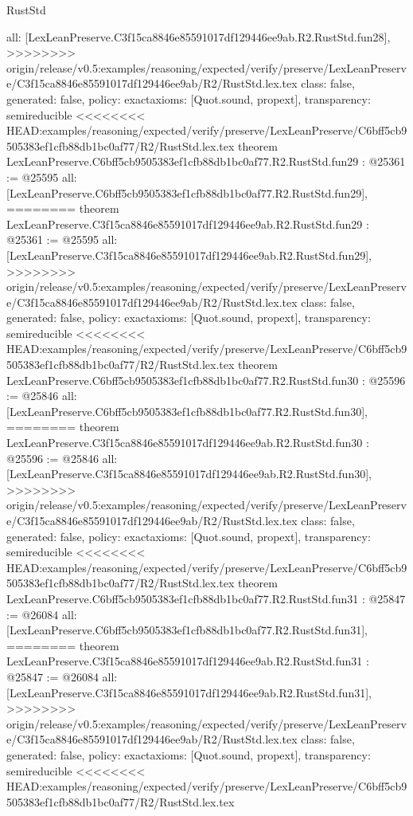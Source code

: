 \begin{lexlean}{RustStd}
\begin{coremodule}
{\begin{coremodule}
{{{{{{{{{{{{{{{{{{{{{{{{{{{{{{{{  all: [LexLeanPreserve.C3f15ca8846e85591017df129446ee9ab.R2.RustStd.fun28],
>>>>>>>> origin/release/v0.5:examples/reasoning/expected/verify/preserve/LexLeanPreserve/C3f15ca8846e85591017df129446ee9ab/R2/RustStd.lex.tex
  class: false,
  generated: false,
  policy: exact{axioms: [Quot.sound, propext]},
  transparency: semireducible
}
<<<<<<<< HEAD:examples/reasoning/expected/verify/preserve/LexLeanPreserve/C6bff5cb9505383ef1cfb88db1bc0af77/R2/RustStd.lex.tex
theorem LexLeanPreserve.C6bff5cb9505383ef1cfb88db1bc0af77.R2.RustStd.fun29 : @25361 := @25595 {
  all: [LexLeanPreserve.C6bff5cb9505383ef1cfb88db1bc0af77.R2.RustStd.fun29],
========
theorem LexLeanPreserve.C3f15ca8846e85591017df129446ee9ab.R2.RustStd.fun29 : @25361 := @25595 {
  all: [LexLeanPreserve.C3f15ca8846e85591017df129446ee9ab.R2.RustStd.fun29],
>>>>>>>> origin/release/v0.5:examples/reasoning/expected/verify/preserve/LexLeanPreserve/C3f15ca8846e85591017df129446ee9ab/R2/RustStd.lex.tex
  class: false,
  generated: false,
  policy: exact{axioms: [Quot.sound, propext]},
  transparency: semireducible
}
<<<<<<<< HEAD:examples/reasoning/expected/verify/preserve/LexLeanPreserve/C6bff5cb9505383ef1cfb88db1bc0af77/R2/RustStd.lex.tex
theorem LexLeanPreserve.C6bff5cb9505383ef1cfb88db1bc0af77.R2.RustStd.fun30 : @25596 := @25846 {
  all: [LexLeanPreserve.C6bff5cb9505383ef1cfb88db1bc0af77.R2.RustStd.fun30],
========
theorem LexLeanPreserve.C3f15ca8846e85591017df129446ee9ab.R2.RustStd.fun30 : @25596 := @25846 {
  all: [LexLeanPreserve.C3f15ca8846e85591017df129446ee9ab.R2.RustStd.fun30],
>>>>>>>> origin/release/v0.5:examples/reasoning/expected/verify/preserve/LexLeanPreserve/C3f15ca8846e85591017df129446ee9ab/R2/RustStd.lex.tex
  class: false,
  generated: false,
  policy: exact{axioms: [Quot.sound, propext]},
  transparency: semireducible
}
<<<<<<<< HEAD:examples/reasoning/expected/verify/preserve/LexLeanPreserve/C6bff5cb9505383ef1cfb88db1bc0af77/R2/RustStd.lex.tex
theorem LexLeanPreserve.C6bff5cb9505383ef1cfb88db1bc0af77.R2.RustStd.fun31 : @25847 := @26084 {
  all: [LexLeanPreserve.C6bff5cb9505383ef1cfb88db1bc0af77.R2.RustStd.fun31],
========
theorem LexLeanPreserve.C3f15ca8846e85591017df129446ee9ab.R2.RustStd.fun31 : @25847 := @26084 {
  all: [LexLeanPreserve.C3f15ca8846e85591017df129446ee9ab.R2.RustStd.fun31],
>>>>>>>> origin/release/v0.5:examples/reasoning/expected/verify/preserve/LexLeanPreserve/C3f15ca8846e85591017df129446ee9ab/R2/RustStd.lex.tex
  class: false,
  generated: false,
  policy: exact{axioms: [Quot.sound, propext]},
  transparency: semireducible
}
<<<<<<<< HEAD:examples/reasoning/expected/verify/preserve/LexLeanPreserve/C6bff5cb9505383ef1cfb88db1bc0af77/R2/RustStd.lex.tex
}}}}}}}}}}}}}}}}}}}}}}}}}}}}}}}}}}
\end{coremodule}}
\end{coremodule}
\end{lexlean}
